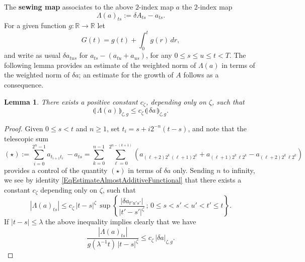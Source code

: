\documentclass[11pt,a4paper]{amsart}
\newcommand{\RR}{\mathbb{R}}  \newcommand{\CC}{\mathbb{C}}  \newcommand{\LL}{\mathbb{L}}  \newcommand{\WW}{\mathbb{W}}
\renewcommand{\leq}{\leqslant}
\renewcommand{\geq}{\geqslant}
\theoremstyle{plain}%
\newtheorem{lemma}[theorem]{Lemma}
\theoremstyle{definition}
\theoremstyle{remark}
\numberwithin{equation}{section} %
\begin{document}
The \textbf{sewing map} associates to the above $2$-index map $a$ the $2$-index map
$$
\Lambda(a)_{ts} := \delta A_{ts} - a_{ts}.
$$
For a given function $g:\RR\to\RR$ let 
$$
G(t) = g(t) + \int_0^t g(r)\,dr,
$$
and write as usual  $\delta a_{tus}$ for $a_{ts} - (a_{tu}+a_{us})$, for any $0\leq s\leq u\leq t<T$. The following lemma provides an estimate of the weighted norm of $\Lambda(a)$ in terms of the weighted norm of $\delta a$; an estimate for the growth of $A$ follows as a consequence. 

\begin{lemma}
\label{LemmaSewingMap}
There exists a positive constant $c_\zeta$, depending only on $\zeta$, such that 
$$
\llparenthesis\,\Lambda(a)\,\rrparenthesis_{\zeta,g} \leq c_\zeta \, \llparenthesis\,\delta a\,\rrparenthesis_{\zeta,g}.
$$
\end{lemma}

\medskip

\begin{proof}
Given $0\leq s<t$ and $n\geq 1$, set $t_i = s+i2^{-n}(t-s)$, and note that the telescopic sum
\begin{equation*}
(\star) := \sum_{i=0}^{2^n-1}a_{t_{i+1}t_i}\; - a_{ts} = \sum_{k=0}^{n-1}\;\sum_{\ell=0}^{2^{n-(k+1)}} (a_{(\ell+2)2^k\,(\ell+1)2^k}+a_{(\ell+1)2^k\,\ell2^k} - a_{(\ell+2)2^k\,\ell2^k} )
\end{equation*}
provides a control of the quantity $(\star)$ in terms of $\delta a$ only. Sending $n$ to infinity, we see by identity \eqref{EqEstimateAlmostAdditiveFunctional} that there exists a constant $c_\zeta$ depending only on $\zeta$, such that 
$$
| \Lambda(a)_{ts} | \leq c_\zeta \, |t-s|^\zeta \,\sup\left\{\frac{|\delta a_{t'u's'}|}{|t'-s'|^\zeta}\,;\,0\leq s<s'<u'<t'\leq t\right\}.
$$
If $|t-s| \leq \lambda$ the above inequality implies clearly that we have
\begin{equation}
\label{EqEstimateLambdaA}
\frac{| \Lambda(a)_{ts} |}{g(\lambda^{-1} t)\,|t-s|^\zeta} \leq c_\zeta \, |\delta a|_{\zeta,g}.
\end{equation}
\end{proof}

\medskip
\end{document}
